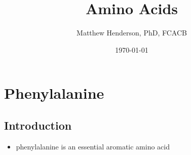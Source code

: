 \documentclass[12pt]{scrartcl}
\author{Matthew Henderson, PhD, FCACB}
\date{\today}
\title{Amino Acids}
\begin{document}
\maketitle
\setcounter{tocdepth}{2}
\tableofcontents



\section{Phenylalanine}
\label{sec:org70a0ed6}
\subsection{Introduction}
\label{sec:org822604d}
\begin{itemize}
\item phenylalanine is an essential aromatic amino acid
\end{itemize}

\begin{center}
\chemnameinit{}
\end{center}
\end{document}
